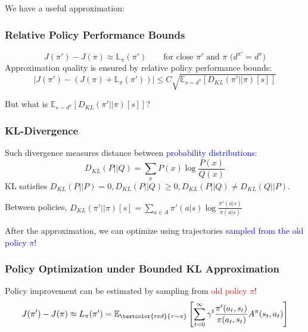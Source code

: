 \documentclass{article}
\begin{document}
    We have a useful approximation:
    \begin{thmbox}
        \subsubsection*{Relative Policy Performance Bounds}
        \begin{equation*}
            J(\pi') - J(\pi) \approx \mathbb{L}_{\pi} (\pi') \quad\quad \text{for close $\pi'$ and $\pi$ ($d^{\pi'} = d^{\pi}$)}
        \end{equation*}
        Approximation quality is ensured by relative policy performance bounds:
        \begin{equation*}
            |J(\pi') - \left( J(\pi) + \mathbb{L}_{\pi} (\pi') \right)| \leq C \sqrt{\mathbb{E}_{s \sim d^{\pi}} \left[ D_{KL} (\pi' || \pi) [s]\right]}
        \end{equation*}
    \end{thmbox}
    
    But what is $\mathbb{E}_{s \sim d^{\pi}} \left[ D_{KL} (\pi' || \pi) [s]\right]$? 
    \begin{defbox}
        \subsubsection*{KL-Divergence}
        Such divergence measures distance between \textcolor{blue}{probability distributions}:
        \begin{equation*}
            D_{KL} (P || Q) = \sum_{x} P(x) \log \frac{P(x)}{Q(x)}
        \end{equation*}
        KL satisfies $D_{KL}(P || P) = 0, D_{KL}(P || Q) \geq 0, D_{KL}(P || Q) \neq D_{KL}(Q || P)$.

        Between policies, $D_{KL}(\pi' || \pi) [s] = \sum_{a \in A} \pi' (a | s) \log \frac{\pi' (a | s)}{\pi (a | s)}$
    \end{defbox}

    After the approximation, we can optimize using trajectories \textcolor{blue}{sampled from the old policy $\pi$}!
    \begin{thmbox}
        \subsubsection*{Policy Optimization under Bounded KL Approximation}
        Policy improvement can be estimated by sampling from \textcolor{red}{old policy $\pi$}!
        \begin{equation*}
            J(\pi') - J(\pi) \approx L_{\pi}(\pi') 
            = \mathbb{E}_{\textcolor{red}{\tau \sim \pi}} \left[ \sum_{t = 0}^{\infty} \gamma^{t} \frac{\pi'(a_t, s_t)}{\pi(a_t, s_t)} A^{\pi}(s_t, a_t) \right]
        \end{equation*}
    \end{thmbox}
\end{document}

